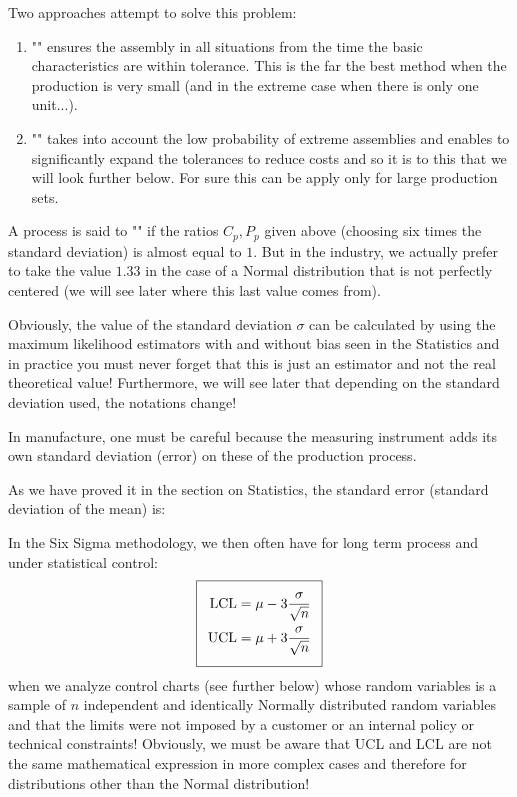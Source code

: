 Two approaches attempt to solve this problem:
	\begin{enumerate}
		\item "" ensures the assembly in all situations from the time the basic characteristics are within tolerance. This is the far the best method when the production is very small (and in the extreme case when there is only one unit...).
		\item "" takes into account the low probability of extreme assemblies and enables to significantly expand the tolerances to reduce costs and so it is to this that we will look further below. For sure this can be apply only for large production sets.
	\end{enumerate}

A process is said to "" if the ratios $C_p,P_p$ given above (choosing six times the standard deviation) is almost equal to $1$. But in the industry, we actually prefer to take  the value $1.33$  in the case of a Normal distribution that is not perfectly centered (we will see later where this last value comes from).

Obviously, the value of the standard deviation  $\sigma$  can be calculated by using the maximum likelihood estimators with and without bias seen in the Statistics and in practice you must never forget that this is just an estimator and not the real theoretical value! Furthermore, we will see later that depending on the standard deviation used, the notations change!

	\begin{tcolorbox}[title=Remark,colframe=black,arc=10pt]
In manufacture, one must be careful because the measuring instrument adds its own standard deviation (error) on these of the production process.
	\end{tcolorbox}

As we have proved it in the section on Statistics, the standard error (standard deviation of the mean) is:
	
	In the Six Sigma methodology, we then often have for long term process and under statistical control:
	\begin{equation}
  \addtolength{\fboxsep}{5pt}
   \boxed{
   \begin{gathered}
		\begin{aligned}
			\text{LCL}&=\mu-3\dfrac{\sigma}{\sqrt{n}}\\
			\text{UCL}&=\mu+3\dfrac{\sigma}{\sqrt{n}}
		\end{aligned}
   \end{gathered}
   }
	\end{equation}
	when we analyze control charts (see further below) whose random variables is a sample of $n$ independent and identically Normally distributed random variables and that the limits were not imposed by a customer or an internal policy or technical constraints! Obviously, we must be aware that UCL and LCL are not the same mathematical expression in more complex cases and therefore for distributions other than the Normal distribution!
	
